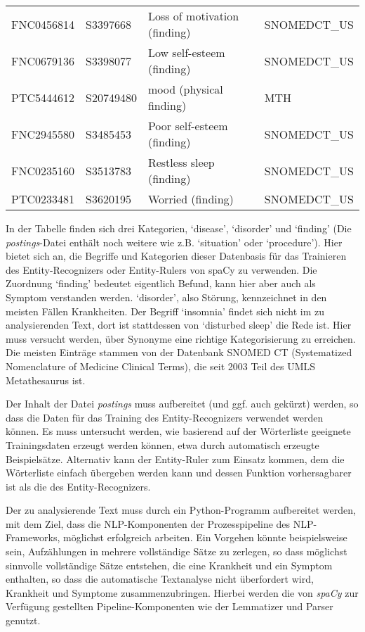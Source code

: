 \begin{center}
\begin{tabular}{llll}
FNC0456814 &	S3397668 &	Loss of motivation (finding)  & SNOMEDCT\_US \\
FNC0679136 &	S3398077 &	Low self-esteem (finding) & SNOMEDCT\_US \\
PTC5444612 &	S20749480 & mood (physical finding) & MTH \\
FNC2945580 &	S3485453 &	Poor self-esteem (finding) &	SNOMEDCT\_US \\
FNC0235160 &	S3513783 &	Restless sleep (finding) & SNOMEDCT\_US \\
PTC0233481 &	S3620195 &	Worried (finding) & SNOMEDCT\_US \\
\hline
\end{tabular}
\end{center}

In der Tabelle finden sich drei Kategorien, `disease', `disorder' und `finding' (Die \emph{postings}-Datei enthält noch weitere wie z.B. `situation' oder `procedure'). Hier bietet sich an, die Begriffe und Kategorien dieser Datenbasis für das Trainieren des Entity-Recognizers oder Entity-Rulers von spaCy zu verwenden. Die Zuordnung `finding' bedeutet eigentlich Befund, kann hier aber auch als Symptom verstanden werden. `disorder', also Störung, kennzeichnet in den meisten Fällen Krankheiten. Der Begriff `insomnia' findet sich nicht im zu analysierenden Text, dort ist stattdessen von `disturbed sleep' die Rede ist. Hier muss versucht werden, über Synonyme eine richtige Kategorisierung zu erreichen. Die meisten Einträge stammen von der Datenbank SNOMED CT (Systematized Nomenclature of Medicine Clinical Terms), die seit 2003 Teil des UMLS Metathesaurus ist. 

Der Inhalt der Datei \emph{postings} muss aufbereitet (und ggf. auch gekürzt) werden, so dass die Daten für das Training des Entity-Recognizers verwendet werden können. Es muss untersucht werden, wie basierend auf der Wörterliste geeignete Trainingsdaten erzeugt werden können, etwa durch automatisch erzeugte Beispielsätze. Alternativ kann der Entity-Ruler zum Einsatz kommen, dem die Wörterliste einfach übergeben werden kann und dessen Funktion vorhersagbarer ist als die des Entity-Recognizers.

Der zu analysierende Text muss durch ein Python-Programm aufbereitet werden, mit dem Ziel, dass die NLP-Komponenten der Prozesspipeline des NLP-Frameworks, möglichst erfolgreich arbeiten. Ein Vorgehen könnte beispielsweise sein, Aufzählungen in mehrere vollständige Sätze zu zerlegen, so dass möglichst sinnvolle vollständige Sätze entstehen, die eine Krankheit und ein Symptom enthalten, so dass die automatische Textanalyse nicht überfordert wird, Krankheit und Symptome zusammenzubringen. Hierbei werden die von \emph{spaCy} zur Verfügung gestellten Pipeline-Komponenten wie der Lemmatizer und Parser genutzt.


